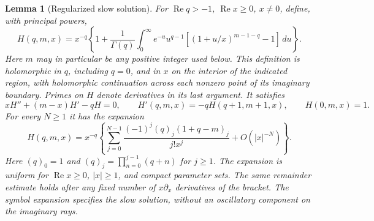 \documentclass[11pt]{article}
\numberwithin{equation}{section}
\newtheorem{lemma}[theorem]{Lemma}
\theoremstyle{definition}
\theoremstyle{remark}
\begin{document}
\begin{lemma}[Regularized slow solution]\label{free:slow}
For $\operatorname{Re}q>-1$, $\operatorname{Re}x\ge0$, $x\ne0$, define, with
principal powers,
\begin{equation}\label{free:H-definition}
 H(q,m,x)=x^{-q}\left\{1+\frac1{\Gamma(q)}
 \int_0^\infty e^{-u}u^{q-1}
 \left[(1+u/x)^{m-1-q}-1\right]\,du\right\}.
\end{equation}
Here $m$ may in particular be any positive integer used below.  This
definition is holomorphic in $q$, including $q=0$, and in $x$ on the
interior of the indicated region, with holomorphic continuation across
each nonzero point of its imaginary boundary.  Primes on $H$ denote
derivatives in its last argument.  It satisfies
\begin{equation}\label{free:H-equation}
 xH''+(m-x)H'-qH=0,\qquad
 H'(q,m,x)=-qH(q+1,m+1,x),\qquad H(0,m,x)=1.
\end{equation}
For every $N\ge1$ it has the expansion
\begin{equation}\label{free:H-expansion}
 H(q,m,x)=x^{-q}\left\{
 \sum_{j=0}^{N-1}\frac{(-1)^j(q)_j(1+q-m)_j}{j!x^j}
 +O(|x|^{-N})\right\}.
\end{equation}
Here $(q)_0=1$ and $(q)_j=\prod_{n=0}^{j-1}(q+n)$ for $j\ge1$.
The expansion is uniform for $\operatorname{Re}x\ge0$, $|x|\ge1$, and compact parameter
sets.  The same remainder estimate holds after any fixed number of
$x\partial_x$ derivatives of the bracket.  The symbol expansion specifies
the slow solution, without an oscillatory component on the imaginary
rays.
\end{lemma}
\end{document}
